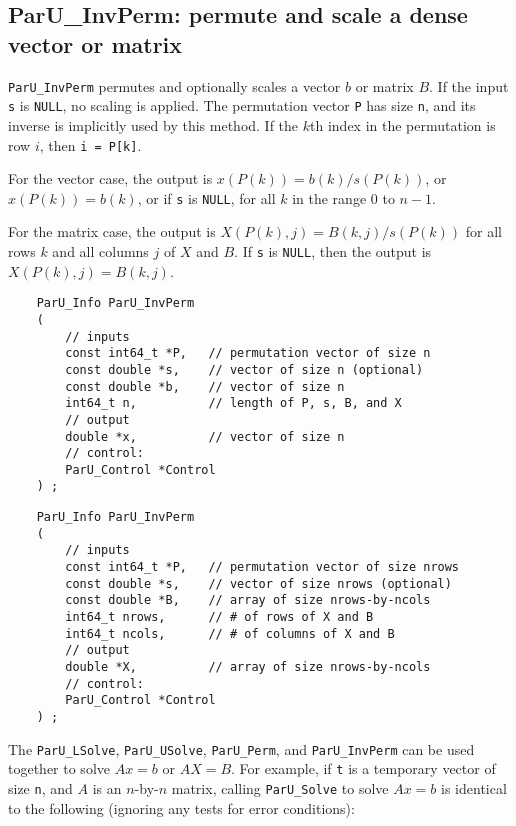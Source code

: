 \documentclass[12pt]{article}
\begin{document}
\subsection{{\sf ParU\_InvPerm}: permute and scale a dense vector or matrix}
\label{invperm}

    \verb'ParU_InvPerm' permutes and optionally scales a vector $b$ or matrix $B$.
    If the input \verb's' is \verb'NULL', no scaling is applied.  The
    permutation vector \verb'P' has size \verb'n', and its inverse is
    implicitly used by this method.  If the $k$th index in the permutation is
    row $i$, then \verb'i = P[k]'.

    For the vector case, the output is $x(P(k)) = b(k) / s(P(k))$, or
    $x(P(k)) = b(k)$, or if \verb's' is \verb'NULL', for all $k$ in the range 0
    to $n-1$.

    For the matrix case, the output is $X(P(k),j) = B(k,j) / s(P(k))$ for all
    rows $k$ and all columns $j$ of $X$ and $B$.  If \verb's' is \verb'NULL',
    then the output is $X(P(k),j) = B(k,j)$.

    {\footnotesize
    \begin{verbatim}
    ParU_Info ParU_InvPerm
    (
        // inputs
        const int64_t *P,   // permutation vector of size n
        const double *s,    // vector of size n (optional)
        const double *b,    // vector of size n
        int64_t n,          // length of P, s, B, and X
        // output
        double *x,          // vector of size n
        // control:
        ParU_Control *Control
    ) ; \end{verbatim} }

    {\footnotesize
    \begin{verbatim}
    ParU_Info ParU_InvPerm
    (
        // inputs
        const int64_t *P,   // permutation vector of size nrows
        const double *s,    // vector of size nrows (optional)
        const double *B,    // array of size nrows-by-ncols
        int64_t nrows,      // # of rows of X and B
        int64_t ncols,      // # of columns of X and B
        // output
        double *X,          // array of size nrows-by-ncols
        // control:
        ParU_Control *Control
    ) ; \end{verbatim} }

    The \verb'ParU_LSolve', \verb'ParU_USolve', \verb'ParU_Perm', and
    \verb'ParU_InvPerm' can be used together to solve $Ax=b$ or $AX=B$.  For
    example, if \verb't' is a temporary vector of size \verb'n', and $A$ is an
    $n$-by-$n$ matrix, calling \verb'ParU_Solve' to solve $Ax=b$ is identical
    to the following (ignoring any tests for error conditions):
\end{document}
